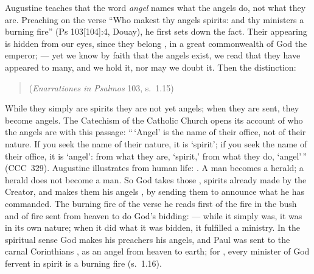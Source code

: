 Augustine teaches that the word \emph{angel} names what the angels do, not
what they are. Preaching on the verse ``Who makest thy angels spirits: and
thy ministers a burning fire'' (Ps 103[104]:4, Douay), he first sets down
the fact. Their appearing is hidden from our eyes, since they belong
, in a great commonwealth
of God the emperor; 
--- yet we know by faith that the angels exist, we read that they have
appeared to many, and we hold it, nor may we doubt it. Then the
distinction:
\begin{quote}
(\emph{Enarrationes in Psalmos} 103, s.~1.15)
\end{quote}
While they simply are spirits they are not yet angels; when they are sent,
they become angels. The Catechism of the Catholic Church opens its account
of who the angels are with this passage: ``\,`Angel' is the name of their
office, not of their nature. If you seek the name of their nature, it is
`spirit'; if you seek the name of their office, it is `angel': from what
they are, `spirit,' from what they do, `angel'\,'' (CCC~329). Augustine
illustrates from human life: . A man becomes a herald; a herald does
not become a man. So God takes those , spirits already made by the Creator, and makes them his
angels , by sending them to
announce what he has commanded. The burning fire of the verse he reads
first of the fire in the bush and of fire sent from heaven to do God's
bidding:  --- while it simply was, it was in its own nature;
when it did what it was bidden, it fulfilled a ministry. In the spiritual
sense God makes his preachers his angels, and Paul was sent to the carnal
Corinthians , as an angel from
heaven to earth; for , every minister of God fervent in spirit is a burning fire
(s.~1.16).

